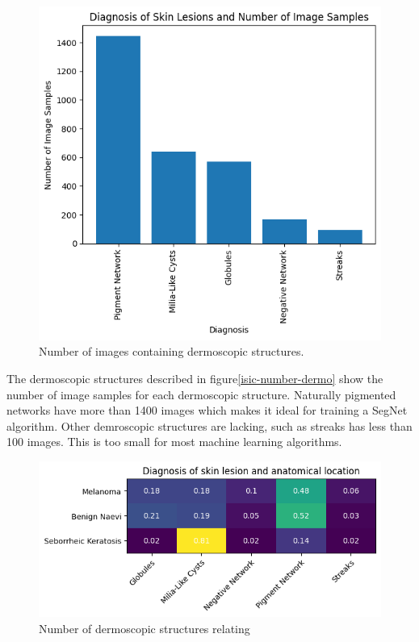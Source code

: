 \begin{figure}
	\centering
	\includegraphics[scale=0.75]{images/ISIC/isic-dermo-number.png}
	\caption{Number of images containing dermoscopic structures.}
\end{figure}\label{isic-number-dermo}

The dermoscopic structures described in figure\ref{isic-number-dermo} show the number of image samples for each dermoscopic structure. Naturally pigmented networks have more than 1400 images which makes it ideal for training a SegNet algorithm. Other demroscopic structures are lacking, such as streaks has less than 100 images. This is too small for most machine learning algorithms.

\begin{figure}
	\centering
	\includegraphics[scale=0.75]{images/ISIC/isic-dermo-diagnosis-heat.png}
	\caption{Number of dermoscopic structures relating}
\end{figure}\label{isic-dermo-diagnosis}

